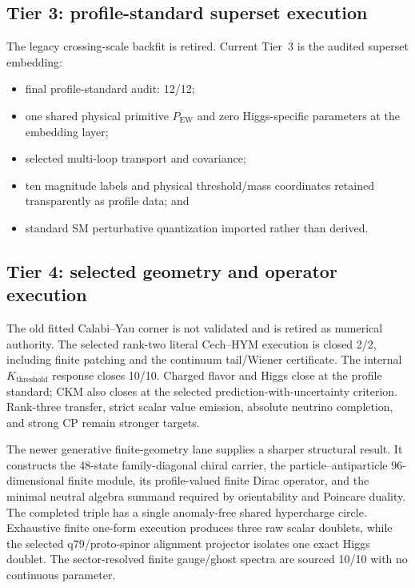 \documentclass[11pt]{article}
\begin{document}
\subsection{Tier 3: profile-standard superset execution}

The legacy crossing-scale backfit is retired. Current Tier~3 is the audited
superset embedding:
\begin{itemize}
\item final profile-standard audit: 12/12;
\item one shared physical primitive $P_{\mathrm{EW}}$ and zero
Higgs-specific parameters at the embedding layer;
\item selected multi-loop transport and covariance;
\item ten magnitude labels and physical threshold/mass coordinates retained
transparently as profile data; and
\item standard SM perturbative quantization imported rather than derived.
\end{itemize}

\subsection{Tier 4: selected geometry and operator execution}

The old fitted Calabi--Yau corner is not validated and is retired as numerical
authority. The selected rank-two literal Cech--HYM execution is closed 2/2,
including finite patching and the continuum tail/Wiener certificate. The
internal $K_{\mathrm{threshold}}$ response closes 10/10. Charged flavor and
Higgs close at the profile standard; CKM also closes at the selected
prediction-with-uncertainty criterion. Rank-three transfer, strict scalar value
emission, absolute neutrino completion, and strong CP remain stronger targets.

The newer generative finite-geometry lane supplies a sharper structural
result. It constructs the 48-state family-diagonal chiral carrier, the
particle--antiparticle 96-dimensional finite module, its profile-valued finite
Dirac operator, and the minimal neutral algebra summand required by
orientability and Poincare duality. The completed triple has a single
anomaly-free shared hypercharge circle. Exhaustive finite one-form execution
produces three raw scalar doublets, while the selected q79/proto-spinor
alignment projector isolates one exact Higgs doublet. The sector-resolved
finite gauge/ghost spectra are sourced 10/10 with no continuous parameter.
\end{document}
